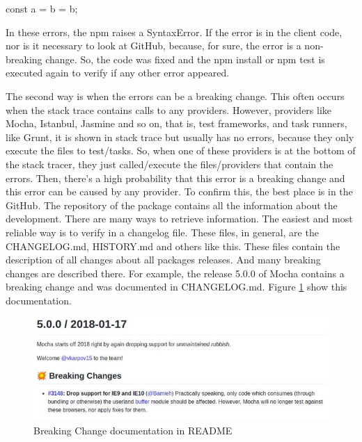 const a = b = b;

In these errors, the npm raises a SyntaxError. If the error is in the client code, nor is it necessary to look at GitHub, because, for sure, the error is a non-breaking change. So, the code was fixed and the npm install or npm test is executed again to verify if any other error appeared.

The second way is when the errors can be a breaking change. This often occurs when the stack trace contains calls to any providers. However, providers like Mocha, Istanbul, Jasmine and so on, that is, test frameworks, and task runners, like Grunt, it is shown in stack trace but usually has no errors, because they only execute the files to test/tasks. So, when one of these providers is at the bottom of the stack tracer, they just called/execute the files/providers that contain the errors. Then, there’s a high probability that this error is a breaking change and this error can be caused by any provider.
To confirm this, the best place is in the GitHub. The repository of the package contains all the information about the development. There are many ways to retrieve information. The easiest and most reliable way is to verify in a changelog file. These files, in general, are the CHANGELOG.md, HISTORY.md and others like this. These files contain the description of all changes about all packages releases. And many breaking changes are described there. For example, the release 5.0.0 of Mocha contains a breaking change and was documented in CHANGELOG.md. Figure \ref{fig:bc_documentation} show this documentation.

\begin{figure}
    \centering
    \includegraphics[scale=0.7]{figuras/bc_documentation.jpeg}
    \caption{Breaking Change documentation in README}
    \label{fig:bc_documentation}
\end{figure}{}

